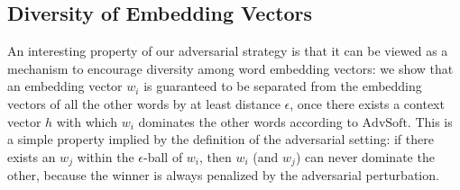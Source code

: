 \documentclass{article}
\newcommand{\ours}{{\mathrm{AdvSoft}}}
\newcommand{\advsoft}{\ours}
\begin{document}
\iffalse 
\subsection{Adversarial-Softmax}
In this section, we use $h$ to refer to the hidden state and 
use $W$ to denote word embeddings, 
consisting of the stacked real vectors $w_i$, where $W_{i\cdot} = w_i$.
Our adversarial softmax function with weigth-tying 
is defined as 
$$
\mathrm{AdvSoft}(Wh) = \frac{\exp(\hat{w}_{i}^\top h)}{\exp(\hat{w}_{i}^\top h) +\sum_{j \neq i}\exp(w_j^\top h)},
$$
where $\hat{w}_i = w_i + a_{w_i}^* (a_{w_i}\in \R^d)$ and the injected noise $a_{w_i}^*$
is chosen to decrease the logit value of the target word to the utmost
within a small neighborhood,
$$
\begin{aligned}
a_{w_i}^* &= \argmin_{a_{w_i}} h^\top(w_i + a_{w_i} ) \\
&\text{s.t.} ~~~||a_{w_i}||\le c_{w_i} \\
\end{aligned}
$$
where $c_{w_i}$ denotes the the amount of noise added to the softmax function.
It is easy to derive the optimal noise direction, which can be written as
$$
a_{w_i}^* = -c_{w_i}{h}/{||h||}.
$$
In this way,
our adversarial softmax yields a more difficult target, to see that, 
$$
w_i^\top h > \hat{w}_i ^\top h = w_i^\top h - c_{w_i}||h||.
$$
\fi 

\subsection{Diversity of Embedding Vectors} 

An interesting property of our adversarial strategy is that  
it can be viewed as a mechanism to encourage diversity among word embedding vectors: we show that an embedding vector $w_i$ is guaranteed 
to be separated from the embedding vectors of all the other words by at least distance $\epsilon$,
once there exists a context vector $h$ 
with which $w_i$ dominates the other words according to $\advsoft$.  
This is a simple property implied by the definition of the adversarial setting:  
if there exists an $w_j$ within the $\epsilon$-ball of $w_i$, 
then $w_i$ (and $w_j$) can never dominate the other, 
because the winner is always penalized by the adversarial perturbation.   
\end{document}
